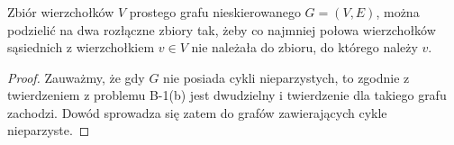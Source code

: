 \subsubsection{} %
\begin{twierdzenie*}
	Zbiór wierzchołków $V$ prostego grafu nieskierowanego $G=(V,E)$, można podzielić na dwa rozłączne zbiory tak, żeby co najmniej połowa wierzchołków sąsiednich z wierzchołkiem $v\in V$ nie należała do zbioru, do którego należy $v$.
\end{twierdzenie*}
\begin{proof}
Zauważmy, że gdy $G$ nie posiada cykli nieparzystych, to zgodnie z twierdzeniem z problemu B-1(b) jest dwudzielny i twierdzenie dla takiego grafu zachodzi. Dowód sprowadza się zatem do grafów zawierających cykle nieparzyste.


\end{proof}


